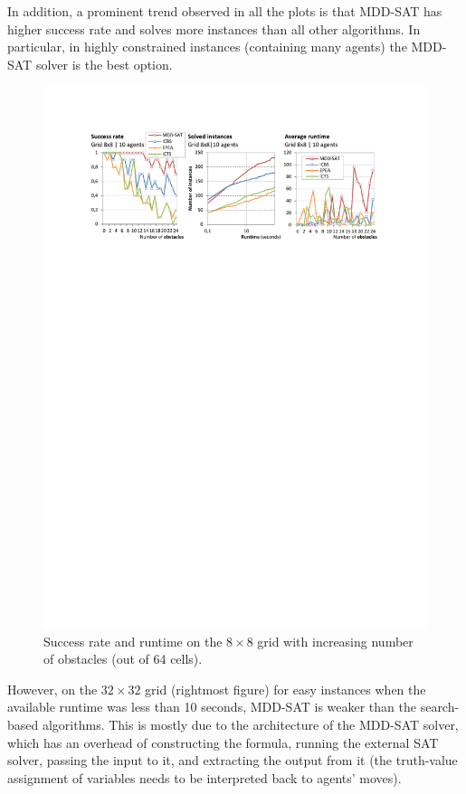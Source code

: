 \documentclass[jair,oneside,11pt]{article}
\begin{document}
In addition, a prominent trend observed in all the plots is that MDD-SAT has higher success rate and solves more instances than all other algorithms. In particular, in highly constrained instances (containing many agents) the MDD-SAT solver is the best option.

\begin{figure}[h]
\centering
\includegraphics[trim={2.5cm 21.0cm 2.5cm 2.5cm},clip,width=\textwidth]{expr_obst-variation-8x8.pdf}
\vspace{-0.4cm}\caption{Success rate and runtime on the $8 \times 8$ grid with increasing
number of obstacles (out of 64 cells).} \label{figure-obstacles}
\end{figure}

However, on the $32{}\times{}32$ grid (rightmost figure) for easy instances when the available runtime was less than 10 seconds, MDD-SAT is weaker than the search-based algorithms. This is mostly due to the architecture of the MDD-SAT solver, which has an overhead of constructing the formula, running the external SAT solver, passing the input to it, and extracting the output from it (the truth-value assignment of variables needs to be interpreted back to agents' moves).
\end{document}
